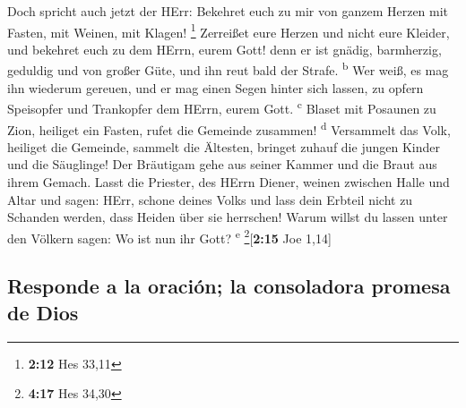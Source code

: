  Doch spricht auch jetzt der HErr: Bekehret euch zu mir
von ganzem Herzen mit Fasten, mit Weinen, mit Klagen! \footnote{\textbf{2:12}
  Hes 33,11}  Zerreißet eure Herzen und nicht eure
Kleider, und bekehret euch zu dem HErrn, eurem Gott! denn er ist gnädig,
barmherzig, geduldig und von großer Güte, und ihn reut bald der Strafe.
\textsuperscript{b}  Wer weiß, es mag ihn wiederum
gereuen, und er mag einen Segen hinter sich lassen, zu opfern Speisopfer
und Trankopfer dem HErrn, eurem Gott. \textsuperscript{c}
 Blaset mit Posaunen zu Zion, heiliget ein Fasten, rufet
die Gemeinde zusammen! \textsuperscript{d}  Versammelt
das Volk, heiliget die Gemeinde, sammelt die Ältesten, bringet zuhauf
die jungen Kinder und die Säuglinge! Der Bräutigam gehe aus seiner
Kammer und die Braut aus ihrem Gemach.  Lasst die
Priester, des HErrn Diener, weinen zwischen Halle und Altar und sagen:
HErr, schone deines Volks und lass dein Erbteil nicht zu Schanden
werden, dass Heiden über sie herrschen! Warum willst du lassen unter den
Völkern sagen: Wo ist nun ihr Gott? \textsuperscript{e}
\footnote{\textbf{4:17} Hes 34,30}{[}\textbf{2:15} Joe 1,14{]}

\hypertarget{responde-a-la-oraciuxf3n-la-consoladora-promesa-de-dios}{%
\subsection{Responde a la oración; la consoladora promesa de
Dios}\label{responde-a-la-oraciuxf3n-la-consoladora-promesa-de-dios}}

